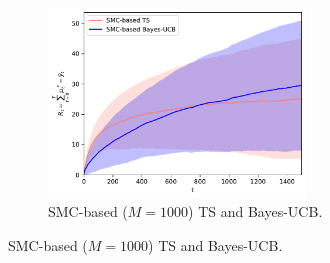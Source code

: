 \begin{figure}[!h]
	\centering
	\begin{subfigure}[b]{\textwidth}
		\centering
		\includegraphics[width=0.75\textwidth]{./fods_figs/static/logistic/A5/theta-2._-2._-1._-1._0._0._1._1._2._2._M1000_cumulative_regret}
		\caption{SMC-based ($M=1000$) TS and Bayes-UCB.}
	\end{subfigure}
	

\end{figure}
